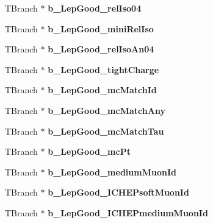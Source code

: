 \begin{DoxyCompactItemize}
T\+Branch $\ast$ {\bfseries b\+\_\+\+Lep\+Good\+\_\+rel\+Iso04}
\item 
\hypertarget{classMiniTree_a451eb47ebb81c30e833e8546946ed598}{}\label{classMiniTree_a451eb47ebb81c30e833e8546946ed598} 
T\+Branch $\ast$ {\bfseries b\+\_\+\+Lep\+Good\+\_\+mini\+Rel\+Iso}
\item 
\hypertarget{classMiniTree_a47b45cc59a6dc5e72882bd90f4b7d8de}{}\label{classMiniTree_a47b45cc59a6dc5e72882bd90f4b7d8de} 
T\+Branch $\ast$ {\bfseries b\+\_\+\+Lep\+Good\+\_\+rel\+Iso\+An04}
\item 
\hypertarget{classMiniTree_a63089b3593db6b2c6a77f47d24ec3eed}{}\label{classMiniTree_a63089b3593db6b2c6a77f47d24ec3eed} 
T\+Branch $\ast$ {\bfseries b\+\_\+\+Lep\+Good\+\_\+tight\+Charge}
\item 
\hypertarget{classMiniTree_a670493cdd4baf17946fda9c6c43cfe06}{}\label{classMiniTree_a670493cdd4baf17946fda9c6c43cfe06} 
T\+Branch $\ast$ {\bfseries b\+\_\+\+Lep\+Good\+\_\+mc\+Match\+Id}
\item 
\hypertarget{classMiniTree_a172954b394829591b9f0ec8a42a8d904}{}\label{classMiniTree_a172954b394829591b9f0ec8a42a8d904} 
T\+Branch $\ast$ {\bfseries b\+\_\+\+Lep\+Good\+\_\+mc\+Match\+Any}
\item 
\hypertarget{classMiniTree_a20576c4156a83db9902f0716e08966a3}{}\label{classMiniTree_a20576c4156a83db9902f0716e08966a3} 
T\+Branch $\ast$ {\bfseries b\+\_\+\+Lep\+Good\+\_\+mc\+Match\+Tau}
\item 
\hypertarget{classMiniTree_a52f6ca6b91348680098525174e5c0fc5}{}\label{classMiniTree_a52f6ca6b91348680098525174e5c0fc5} 
T\+Branch $\ast$ {\bfseries b\+\_\+\+Lep\+Good\+\_\+mc\+Pt}
\item 
\hypertarget{classMiniTree_a7d4a3a74dfa034bea39fe7733bde8334}{}\label{classMiniTree_a7d4a3a74dfa034bea39fe7733bde8334} 
T\+Branch $\ast$ {\bfseries b\+\_\+\+Lep\+Good\+\_\+medium\+Muon\+Id}
\item 
\hypertarget{classMiniTree_a0602066df0b5c0bd26965e79816d1e56}{}\label{classMiniTree_a0602066df0b5c0bd26965e79816d1e56} 
T\+Branch $\ast$ {\bfseries b\+\_\+\+Lep\+Good\+\_\+\+I\+C\+H\+E\+Psoft\+Muon\+Id}
\item 
\hypertarget{classMiniTree_aa87df52b47c2cf5ccd89351554cfb7f8}{}\label{classMiniTree_aa87df52b47c2cf5ccd89351554cfb7f8} 
T\+Branch $\ast$ {\bfseries b\+\_\+\+Lep\+Good\+\_\+\+I\+C\+H\+E\+Pmedium\+Muon\+Id}
\item 
\hypertarget{classMiniTree_abbc14d887749ddaa375ce1cb25e11db1}{}\label{classMiniTree_abbc14d887749ddaa375ce1cb25e11db1} 

\end{DoxyCompactItemize}
